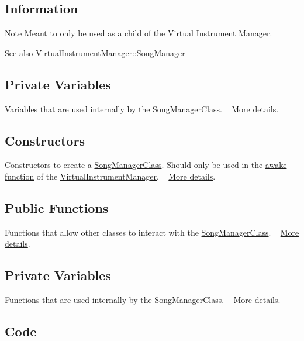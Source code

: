\hypertarget{group___doc_s_m_DocSMInfo}{}\subsection{Information}\label{group___doc_s_m_DocSMInfo}
\begin{DoxyNote}{Note}
Meant to only be used as a child of the \hyperlink{group___v_i_m}{Virtual Instrument Manager}.
\end{DoxyNote}
\begin{DoxySeeAlso}{See also}
\hyperlink{group___v_i_m_pub_ga33dae94932c10c66db76a0eebec76b01}{Virtual\+Instrument\+Manager\+::\+Song\+Manager}
\end{DoxySeeAlso}
\hypertarget{group___doc_s_m_DocSMPrivVar}{}\subsection{Private Variables}\label{group___doc_s_m_DocSMPrivVar}
Variables that are used internally by the \hyperlink{class_song_manager_class}{Song\+Manager\+Class}. ~\newline
 \hyperlink{group___s_m_priv_var}{More details}.\hypertarget{group___doc_s_m_DocSMConstruct}{}\subsection{Constructors}\label{group___doc_s_m_DocSMConstruct}
Constructors to create a \hyperlink{class_song_manager_class}{Song\+Manager\+Class}. Should only be used in the \hyperlink{group___v_i_m_unity_gab92bac4e22476ffe39fc40f49fbd6ae5}{awake function} of the \hyperlink{group___v_i_m}{Virtual\+Instrument\+Manager}. ~\newline
 \hyperlink{group___s_m_construct}{More details}.\hypertarget{group___doc_s_m_DocSMPubFunc}{}\subsection{Public Functions}\label{group___doc_s_m_DocSMPubFunc}
Functions that allow other classes to interact with the \hyperlink{class_song_manager_class}{Song\+Manager\+Class}. ~\newline
 \hyperlink{group___s_m_pub_func}{More details}.\hypertarget{group___doc_s_m_DocSMPrivFunc}{}\subsection{Private Variables}\label{group___doc_s_m_DocSMPrivFunc}
Functions that are used internally by the \hyperlink{class_song_manager_class}{Song\+Manager\+Class}. ~\newline
 \hyperlink{group___s_m_priv_func}{More details}.\hypertarget{group___doc_s_m_DocSMCode}{}\subsection{Code}\label{group___doc_s_m_DocSMCode}

